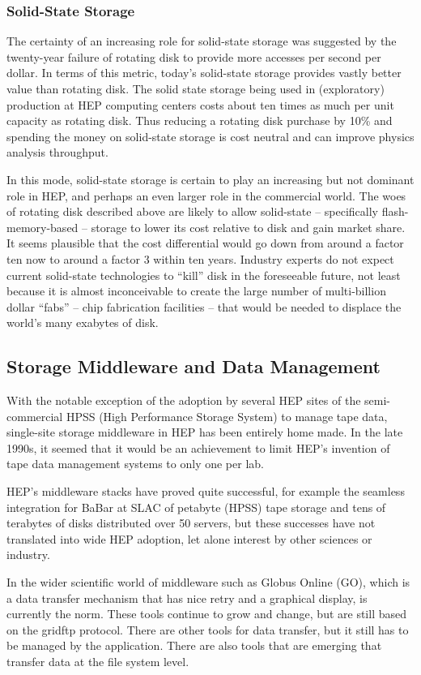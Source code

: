 \subsubsection{Solid-State Storage}
The certainty of an increasing role for solid-state storage was suggested by the twenty-year failure of rotating disk to provide more accesses per second per dollar.  In terms of this metric, today’s solid-state storage provides vastly better value than rotating disk.  The solid state storage being used in (exploratory) production at HEP computing centers costs about ten times as much per unit capacity as rotating disk.  Thus reducing a rotating disk purchase by 10\% and spending the money on solid-state storage is cost neutral and can improve physics analysis throughput.

In this mode, solid-state storage is certain to play an increasing but not dominant role in HEP, and perhaps an even larger role in the commercial world.  The woes of rotating disk described above are likely to allow solid-state – specifically flash-memory-based – storage to lower its cost relative to disk and gain market share.  It seems plausible that the cost differential would go down from around a factor ten now to around a factor 3 within ten years.  Industry experts do not expect current solid-state technologies to “kill” disk in the foreseeable future, not least because it is almost inconceivable to create the large number of multi-billion dollar “fabs” – chip fabrication facilities – that would be needed to displace the world’s many exabytes of disk.

\subsection{Storage Middleware and Data Management}
With the notable exception of the adoption by several HEP sites of the semi-commercial HPSS (High Performance Storage System) to manage tape data, single-site storage middleware in HEP has been entirely home made.  In the late 1990s, it seemed that it would be an achievement to limit HEP’s invention of tape data management systems to only one per lab.

HEP’s middleware stacks have proved quite successful, for example the seamless integration for BaBar at SLAC of petabyte (HPSS) tape storage and tens of terabytes of disks distributed over 50 servers, but these successes have not translated into wide HEP adoption, let alone interest by other sciences or industry. 

In the wider scientific world of middleware such as Globus Online (GO), which is a data transfer mechanism that has nice retry and a graphical display, is currently the norm.  These tools continue to grow and change, but are still based on the gridftp protocol.  There are other tools for data transfer, but it still has to be managed by the application.   There are  also tools that are emerging that transfer data at the file system level.  

